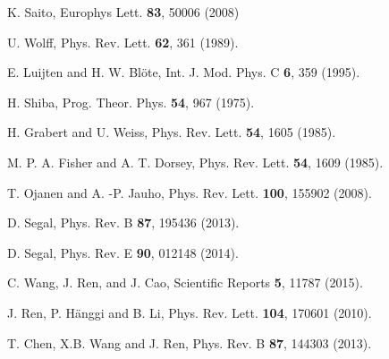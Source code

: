 \documentclass[12pt]{iopart}
\begin{document}
\begin{thebibliography}{99}
K. Saito, Europhys Lett. \textbf{83}, 50006 (2008) 


U. Wolff, Phys. Rev. Lett. {\bf 62}, 361 (1989).

E. Luijten and H. W. Bl\"ote, Int. J. Mod. Phys. C \textbf {6}, 359 (1995).

H. Shiba, Prog. Theor. Phys. {\bf 54}, 967 (1975).

H. Grabert and U. Weiss, Phys. Rev. Lett. {\bf 54}, 1605 (1985).

M. P. A. Fisher and A. T. Dorsey, Phys. Rev. Lett. {\bf 54}, 1609 (1985).

T. Ojanen and A. -P. Jauho, Phys. Rev. Lett. {\bf 100}, 155902 (2008).

D. Segal, Phys. Rev. B {\bf 87}, 195436 (2013).

D. Segal, Phys. Rev. E {\bf 90}, 012148 (2014).

C. Wang, J. Ren, and J. Cao, Scientific Reports {\bf 5}, 11787 (2015).

J. Ren, P. H\"{a}nggi and B. Li, Phys. Rev. Lett. {\bf 104}, 170601 (2010).

 T. Chen, X.B. Wang and J. Ren, Phys. Rev. B {\bf 87}, 144303 (2013).

\end{thebibliography}
\end{document}
